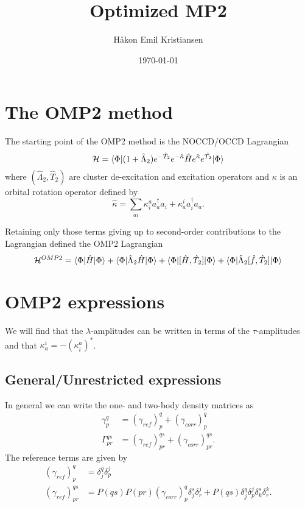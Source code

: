 \documentclass[10pt,a4paper]{article}
\author{Håkon Emil Kristiansen}
\title{Optimized MP2}
\date{\today}
\begin{document}
\maketitle

\section{The OMP2 method}
The starting point of the OMP2 method is the NOCCD/OCCD Lagrangian 
\begin{equation}
\mathcal{H} = \braket{\Phi|(1+\hat{\Lambda}_2)e^{-\hat{T}_2}e^{-\hat{\kappa}}\hat{H}e^{\hat{\kappa}}e^{\hat{T_2}}|\Phi}
\end{equation}
where $(\hat{\Lambda}_2,\hat{T}_2)$ are cluster de-excitation and excitation operators and $\kappa$ is an orbital rotation operator defined by
\begin{equation}
\hat{\kappa} = \sum_{ai} \kappa^a_i a_a^\dagger a_i + \kappa^i_a a_i^\dagger a_a.
\end{equation}

Retaining only those terms giving up to second-order contributions to the Lagrangian defined the OMP2 Lagrangian
\begin{equation}
\mathcal{H}^{OMP2} = \braket{\Phi|\hat{H}|\Phi} + \braket{\Phi|\hat{\Lambda}_2\hat{H}|\Phi} + \braket{\Phi|[\hat{H},\hat{T}_2]|\Phi} + \braket{\Phi|\hat{\Lambda}_2[\hat{f}, \hat{T}_2 ]|\Phi}
\end{equation}

\section{OMP2 expressions}
We will find that the $\lambda$-amplitudes can be written in terms of the $\tau$-amplitudes and that $\kappa^i_a = -(\kappa^a_i)^*$.
\subsection{General/Unrestricted expressions}
In general we can write the one- and two-body density matrices as 
\begin{align}
\gamma_p^q &= (\gamma_{ref})_p^q+(\gamma_{corr})_p^q \\
\Gamma_{pr}^{qs} &= (\gamma_{ref})_{pr}^{qs}+(\gamma_{corr})_{pr}^{qs}. 
\end{align}
The reference terms are given by 
\begin{align}
(\gamma_{ref})_p^q &= \delta^q_j \delta^j_p \\
(\gamma_{ref})_{pr}^{qs} &= P(qs)P(pr) (\gamma_{corr})_p^q \delta^s_j \delta^j_r + P(qs)\delta^q_j\delta^j_p\delta^s_k\delta^k_r.
\end{align}
\end{document}
